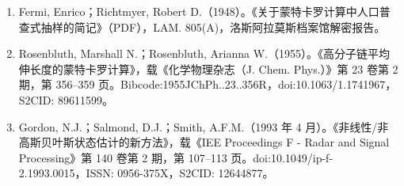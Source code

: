 \begin{enumerate}
\item Fermi, Enrico；Richtmyer, Robert D.（1948）。《关于蒙特卡罗计算中人口普查式抽样的简记》（PDF），LAM. 805(A)，洛斯阿拉莫斯档案馆解密报告。
\item Rosenbluth, Marshall N.；Rosenbluth, Arianna W.（1955）。《高分子链平均伸长度的蒙特卡罗计算》，载《化学物理杂志（J. Chem. Phys.）》第 23 卷第 2 期，第 356–359 页。Bibcode:1955JChPh..23..356R，doi:10.1063/1.1741967，S2CID: 89611599。
\item Gordon, N.J.；Salmond, D.J.；Smith, A.F.M.（1993 年 4 月）。《非线性/非高斯贝叶斯状态估计的新方法》，载《IEE Proceedings F - Radar and Signal Processing》第 140 卷第 2 期，第 107–113 页。doi:10.1049/ip-f-2.1993.0015，ISSN: 0956-375X，S2CID: 12644877。


\end{enumerate}